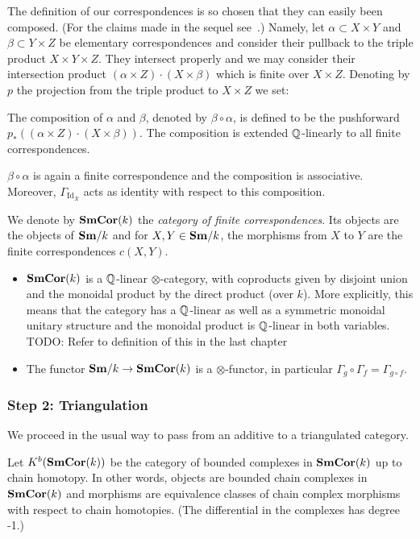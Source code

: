 The definition of our correspondences is so chosen that they can
easily been composed. (For the claims made in the sequel
see~\cite[chapter~1]{MVW-motcoh}.) Namely, let $\alpha\subset X\times
Y$ and $\beta\subset Y\times Z$ be elementary correspondences and
consider their pullback to the triple product $X\times Y\times
Z$. They intersect properly and we may consider their intersection
product $(\alpha\times Z)\cdot(X\times \beta)$ which is finite over
$X\times Z$. Denoting by $p$ the projection from the triple product to
$X\times Z$ we set:
\begin{defn} The composition of $\alpha$ and $\beta$, denoted by
  $\beta\circ \alpha$, is defined to be the pushforward
  $p_{*}((\alpha\times Z)\cdot(X\times \beta))$. The composition is
  extended $\mathbb{Q}$-linearly to all finite correspondences.
\end{defn}
$\beta\circ\alpha$ is again a finite correspondence and the
composition is associative. Moreover, $\Gamma_{\mathrm{Id}_{X}}$ acts
as identity with respect to this composition.
\begin{defn}
  We denote by $\mathbf{SmCor}(k)$ the \emph{category of finite
    correspondences}. Its objects are the objects of $\mathbf{Sm}/k$ and for
  $X, Y \in \mathbf{Sm}/k$, the morphisms from $X$ to $Y$ are the finite
  correspondences $c(X,Y)$.
\end{defn}

\begin{rem}
\begin{itemize}
\item $\mathbf{SmCor}(k)$ is a $\mathbb{Q}$-linear $\otimes$-category, with coproducts
  given by disjoint union and the monoidal product by the direct
  product (over $k$). More explicitly, this means that the category
  has a $\mathbb{Q}$-linear as well as a symmetric monoidal unitary structure
  and the monoidal product is $\mathbb{Q}$-linear in both variables. TODO:
                               Refer to definition of this in the
                                last chapter
                              \item The functor $\mathbf{Sm}/k \to \mathbf{SmCor}(k)$
                                is a $\otimes$-functor, in particular
                                $\Gamma_{g}\circ
                                \Gamma_{f}=\Gamma_{g\circ f}$.
\end{itemize}
\end{rem}

\subsubsection{Step 2: Triangulation}
We proceed in the usual way to pass from an additive to a triangulated
category.
\begin{defn}
  Let $K^{b}(\mathbf{SmCor}(k))$ be the category of bounded complexes
  in $\mathbf{SmCor}(k)$ up to chain homotopy. In other words, objects are
  bounded chain complexes in $\mathbf{SmCor}(k)$ and morphisms are equivalence
  classes of chain complex morphisms with respect to chain
  homotopies. (The differential in the complexes has degree -1.)
\end{defn}

